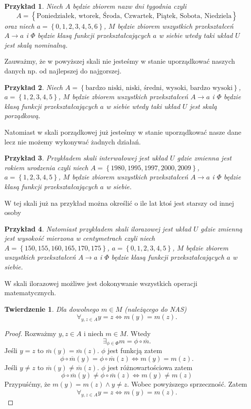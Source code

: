 \documentclass[12pt,a4paper]{report}
\newtheorem{przyklad}{Przykład}
\newtheorem{tw}{Twierdzenie}
\newcommand{\zbior}[1]{\left\lbrace {#1} \right\rbrace }
\begin{document}
\begin{przyklad}
Niech $A$ będzie zbiorem nazw dni tygodnia czyli  $$
A=\zbior{\textrm{Poniedziałek, wtorek, Środa, Czwartek, Piątek, Sobota, Niedziela}}
$$
oraz niech $a=\zbior{0,1,2,3,4,5,6}$, $M$ będzie zbiorem wszystkich przekształceń $A \to a$ i $\Phi$ będzie klasą funkcji przekształcających $a$ w siebie wtedy taki układ $U$ jest skalą nominalną.
\end{przyklad}
Zauważmy, że w powyższej skali nie jesteśmy w stanie uporządkować naszych danych np. od najlepszej do najgorszej. 
\begin{przyklad}
Niech $A=\zbior{\textrm{bardzo niski, niski, średni, wysoki, bardzo wysoki}}$, $a=\zbior{1,2,3,4,5}$, $M$ będzie zbiorem wszystkich przekształceń $A \to a$ i $\Phi$ będzie klasą funkcji przekształcających $a$ w siebie wtedy taki układ $U$ jest skalą porządkową.
\end{przyklad}
Natomiast w skali porządkowej już jesteśmy w stanie uporządkować nasze dane lecz nie możemy wykonywać żadnych działań.
\begin{przyklad}
Przykładem skali interwałowej jest układ $U$ gdzie zmienna jest rokiem urodzenia czyli niech $A=\zbior{1980,1995,1997,2000,2009}$, $a=\zbior{1,2,3,4,5}$, $M$ będzie zbiorem wszystkich przekształceń $A \to a$ i $\Phi$ będzie klasą funkcji przekształcających $a$ w siebie.
\end{przyklad}
W tej skali już na przykład można określić o ile lat ktoś jest starszy od innej osoby 
\begin{przyklad}
Natomiast przykładem skali ilorazowej jest układ $U$ gdzie zmienną jest wysokość mierzona w centymetrach czyli niech $A=\zbior{150,155,160,165,170,175}$, $a=\zbior{0,1,2,3,4,5}$, $M$ będzie zbiorem wszystkich przekształceń $A \to a$ i $\Phi$ będzie klasą funkcji przekształcających $a$ w siebie.
\end{przyklad}
W skali ilorazowej możliwe jest dokonywanie wszystkich operacji matematycznych.
\begin{tw}
Dla dowolnego $m\in M$ (należącego do NAS) $$
\forall_{y,z \in A} y=z \iff m(y)=m(z).
$$
\end{tw}
\begin{proof}
Rozważmy $y,z \in A$ i niech $m \in M$. Wtedy
\begin{equation*}
\exists_{\phi \in \Phi} m=\phi \circ \overline{m}.
\end{equation*}
Jeśli $y=z$ to $\overline{m}(y)=\overline{m}(z)$. $\phi$ jest funkcją zatem 
\begin{equation*}
\phi \circ \overline{m}(y)=\phi \circ \overline{m}(z) \iff m(y)=m(z).
\end{equation*}
Jeśli $y\ne z$ to $\overline{m}(y)\ne \overline{m}(z)$. $\phi$ jest różnowartościowa zatem
\begin{equation*}
\phi \circ \overline{m}(y) \ne \phi \circ \overline{m}(z) \iff m(y) \ne m(z)
\end{equation*}
Przypuśćmy, że $m(y)=m(z) \land y \ne z$. Wobec powyższego sprzeczność. Zatem
\begin{equation*}
\forall_{y,z \in A} y=z \iff m(y)=m(z).
\end{equation*}
\end{proof}
\end{document}
